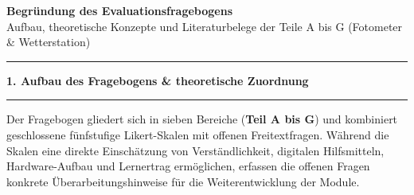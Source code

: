 \documentclass[a4paper,10pt]{article}
\newcommand{\sectionheader}[1]{%
  \vspace{6pt}
  {\large \bfseries \color{primary} #1}\\[-4pt]
  {\color{accent}\rule{\linewidth}{1.5pt}}\vspace{2pt}
}
\begin{document}
{\LARGE \bfseries \color{primary} Begründung des Evaluationsfragebogens}\\[2pt]
{\normalsize \color{quotegray} Aufbau, theoretische Konzepte und Literaturbelege der Teile A bis G (Fotometer \& Wetterstation)}\\[4pt]
\rule{\linewidth}{0.6pt}

\sectionheader{1. Aufbau des Fragebogens \& theoretische Zuordnung}

Der Fragebogen gliedert sich in sieben Bereiche (\textbf{Teil A bis G}) und kombiniert geschlossene fünfstufige Likert-Skalen mit offenen Freitextfragen. Während die Skalen eine direkte Einschätzung von Verständlichkeit, digitalen Hilfsmitteln, Hardware-Aufbau und Lernertrag ermöglichen, erfassen die offenen Fragen konkrete Überarbeitungshinweise für die Weiterentwicklung der Module.
\end{document}
